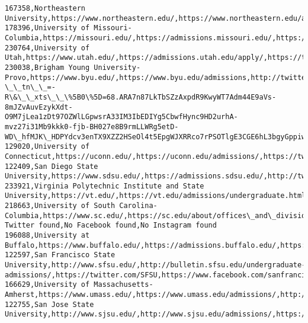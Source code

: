\documentclass[11pt]{article}
\begin{document}
\begin{Verbatim}[commandchars=\\\{\}]
167358,Northeastern University,https://www.northeastern.edu/,https://www.northeastern.edu/admissions/,//twitter.com/Northeastern,//www.facebook.com/northeastern/,https://www.instagram.com/northeastern/
178396,University of Missouri-Columbia,https://missouri.edu/,https://admissions.missouri.edu/,https://twitter.com/mizzou,https://facebook.com/Mizzou,https://instagram.com/mizzou
230764,University of Utah,https://www.utah.edu/,https://admissions.utah.edu/apply/,https://twitter.com/UUtah,http://www.facebook.com/universityofutah,https://www.instagram.com/universityofutah/
230038,Brigham Young University-Provo,https://www.byu.edu/,https://www.byu.edu/admissions,http://twitter.com/byu,https://www.facebook.com/BYU/videos/158650175080587/?\_\_tn\_\_=-R\&\_\_xts\_\_\%5B0\%5D=68.ARA7n87LkTbSZzAxpdR9KwyWT7Adm44E9aVs-8mJZvAuvEzykXdt-O9M7jLea1zDt97OZWlLGpwsrA33IM3IbEDIYg5CbwfHync9HD2urhA-mvz27i31Mb9kkk0-fjb-BH027e8B9rmLLWRg5etD-WD\_hfMJK\_HDPYdcv3enTX9XZZ2HSeOl4t5EpgWJXRRco7rPSOTlgE3CGE6hL3bgyGppiwYN4GzRQvXoXkbOFw,https://www.instagram.com/brighamyounguniversity/
129020,University of Connecticut,https://uconn.edu/,https://uconn.edu/admissions/,https://twitter.com/uconn,https://facebook.com/UConn,https://instagram.com/UConn/
122409,San Diego State University,https://www.sdsu.edu/,https://admissions.sdsu.edu/,http://twitter.com/sdsu,http://www.facebook.com/SanDiegoState,http://instagram.com/sandiegostateuniversity\#
233921,Virginia Polytechnic Institute and State University,https://vt.edu/,https://vt.edu/admissions/undergraduate.html,https://twitter.com/virginia\_tech,https://facebook.com/virginiatech,https://instagram.com/virginia.tech
218663,University of South Carolina-Columbia,https://www.sc.edu/,https://sc.edu/about/offices\_and\_divisions/undergraduate\_admissions/,No Twitter found,No Facebook found,No Instagram found
196088,University at Buffalo,https://www.buffalo.edu/,https://admissions.buffalo.edu/,https://twitter.com/UBuffalo,https://www.facebook.com/universityatbuffalo,https://www.instagram.com/universityatbuffalo/
122597,San Francisco State University,http://www.sfsu.edu/,http://bulletin.sfsu.edu/undergraduate-admissions/,https://twitter.com/SFSU,https://www.facebook.com/sanfranciscostate,http://instagram.com/sanfranciscostate
166629,University of Massachusetts-Amherst,https://www.umass.edu/,https://www.umass.edu/admissions/,http://twitter.com/umassamherst,http://www.facebook.com/umassamherst,http://instagram.com/umass
122755,San Jose State University,http://www.sjsu.edu/,http://www.sjsu.edu/admissions/,https://twitter.com/sjsu,http://www.facebook.com/sanjosestate,http://www.instagram.com/sjsu

\end{Verbatim}
\end{document}
